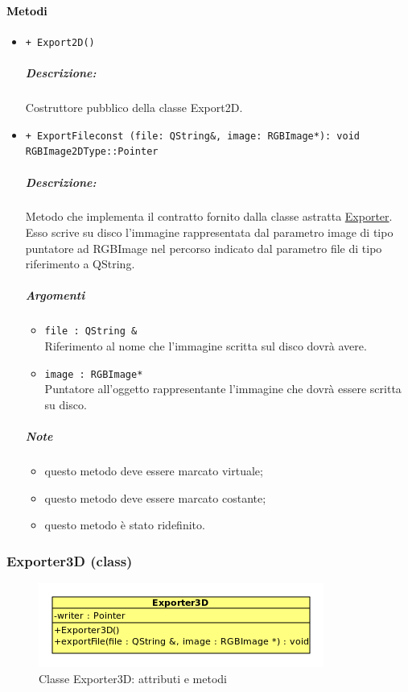 \paragraph{\textcolor{black}{Metodi}}
	\begin{itemize}
		\item \color{blue}\verb!+ Export2D()!
		\color{black}
		\subparagraph{Descrizione:} Costruttore pubblico della classe Export2D.


		\item \color{blue}\verb!+ ExportFileconst (file: QString&, image: RGBImage*): void RGBImage2DType::Pointer!
		\color{black}
		\subparagraph{Descrizione:} Metodo che implementa il contratto fornito dalla classe astratta \hyperref[spexporter]{Exporter}. Esso scrive su disco l'immagine rappresentata dal parametro image di tipo puntatore ad RGBImage nel percorso indicato dal parametro file di tipo riferimento a QString.

		\subparagraph{Argomenti}
			\begin{itemize}
				\item \color{RoyalPurple}\verb!file : QString &! \\ 
				\color{black}Riferimento al nome che l'immagine scritta sul disco dovrà avere.
				\item \color{RoyalPurple}\verb!image : RGBImage*! \\ 
				\color{black}Puntatore all'oggetto rappresentante l'immagine che dovrà essere scritta su disco.
			\end{itemize}
\color{black}
		\subparagraph{Note}
			\begin{itemize}
				\item questo metodo deve essere marcato virtuale;
				\item questo metodo deve essere marcato costante;
				\item questo metodo è stato ridefinito.
			\end{itemize} 
	\end{itemize}
\color{black}


\subsubsection{Exporter3D (class)}
\label{spexporter3d}
\begin{figure}[!h]
\centering
			\includegraphics[scale=1]{./Content/Immagini/model/Exporter3D.png}
			\caption{Classe Exporter3D: attributi e metodi}
			\label{cl_exporter3d}
\end{figure}
